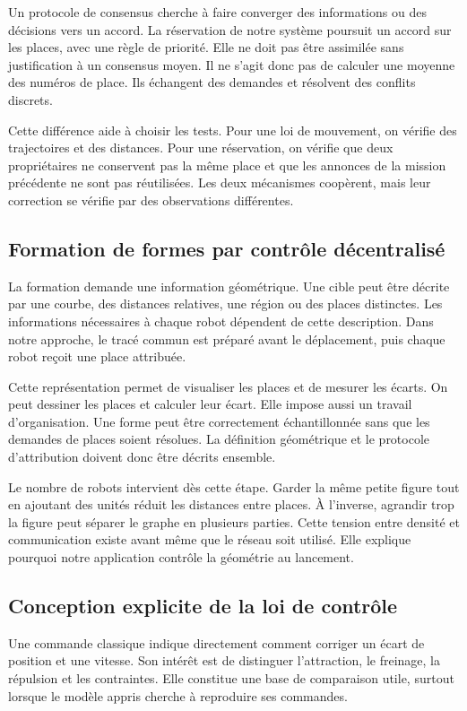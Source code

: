 Un protocole de consensus cherche à faire converger des informations ou des décisions vers un accord. La réservation de notre système poursuit un accord sur les places, avec une règle de priorité. Elle ne doit pas être assimilée sans justification à un consensus moyen. Il ne s'agit donc pas de calculer une moyenne des numéros de place. Ils échangent des demandes et résolvent des conflits discrets.

Cette différence aide à choisir les tests. Pour une loi de mouvement, on vérifie des trajectoires et des distances. Pour une réservation, on vérifie que deux propriétaires ne conservent pas la même place et que les annonces de la mission précédente ne sont pas réutilisées. Les deux mécanismes coopèrent, mais leur correction se vérifie par des observations différentes.

\subsection{Formation de formes par contrôle décentralisé}
La formation demande une information géométrique. Une cible peut être décrite par une courbe, des distances relatives, une région ou des places distinctes. Les informations nécessaires à chaque robot dépendent de cette description. Dans notre approche, le tracé commun est préparé avant le déplacement, puis chaque robot reçoit une place attribuée.

Cette représentation permet de visualiser les places et de mesurer les écarts. On peut dessiner les places et calculer leur écart. Elle impose aussi un travail d'organisation. Une forme peut être correctement échantillonnée sans que les demandes de places soient résolues. La définition géométrique et le protocole d'attribution doivent donc être décrits ensemble.

Le nombre de robots intervient dès cette étape. Garder la même petite figure tout en ajoutant des unités réduit les distances entre places. À l'inverse, agrandir trop la figure peut séparer le graphe en plusieurs parties. Cette tension entre densité et communication existe avant même que le réseau soit utilisé. Elle explique pourquoi notre application contrôle la géométrie au lancement.

\subsection{Conception explicite de la loi de contrôle}
Une commande classique indique directement comment corriger un écart de position et une vitesse. Son intérêt est de distinguer l'attraction, le freinage, la répulsion et les contraintes. Elle constitue une base de comparaison utile, surtout lorsque le modèle appris cherche à reproduire ses commandes.

